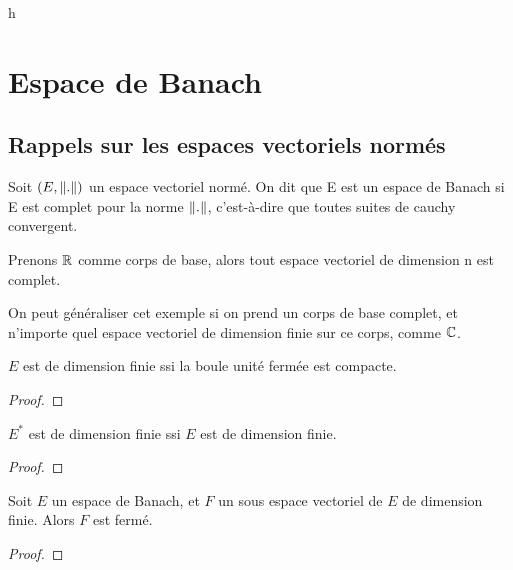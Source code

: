 h\chapter{Espace de Banach}

\section{Rappels sur les espaces vectoriels normés}

\begin{definition} 
	Soit $(E, \norm{.})$ un espace vectoriel normé. On dit que E
	est un espace de Banach si E est complet pour la norme $\norm{.}$,
	c'est-à-dire que toutes suites de cauchy convergent.
\end{definition}

Prenons $\mathbb{R}$ comme corps de base, alors tout espace vectoriel de dimension n
est complet.

On peut généraliser cet exemple si on prend un corps de base complet, et
n'importe quel espace vectoriel de dimension finie sur ce corps, comme
$\mathbb{C}$.

\begin{theorem} [Riesz]
\label{theorem_riesz_compact}
	$E$ est de dimension finie ssi la boule unité fermée est compacte.
\end{theorem}

\ifdefined\outputproof
\begin{proof}

\end{proof}
\fi

\begin{proposition}
\label{proposition_dual_dimension}
	$E^{*}$ est de dimension finie ssi $E$ est de dimension finie.
\end{proposition}

\ifdefined\outputproof
\begin{proof}

\end{proof}
\fi

\begin{theorem}
\label{theorem_closed_vectorial_subspace}
	Soit $E$ un espace de Banach, et $F$ un sous espace vectoriel de $E$ de
	dimension finie.
	Alors $F$ est fermé.
\end{theorem}

\ifdefined\outputproof
\begin{proof}

\end{proof}
\fi


